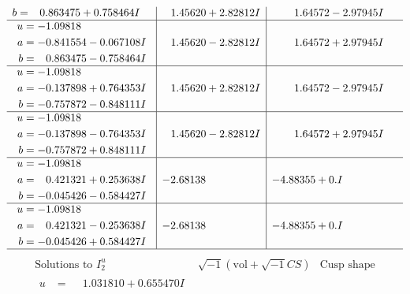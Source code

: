 \documentclass[1p]{elsarticle_modified}
\theoremstyle{definition}
\newcommand{\I}{\sqrt{-1}}
\begin{document}
$$\begin{array}{c|c|c}
\begin{aligned}
b &= \phantom{-}0.863475 + 0.758464 I\end{aligned}
 & \phantom{-}1.45620 + 2.82812 I & \phantom{-}1.64572 - 2.97945 I \\ \hline\begin{aligned}
u &= -1.09818\phantom{ +0.000000I} \\
a &= -0.841554 - 0.067108 I \\
b &= \phantom{-}0.863475 - 0.758464 I\end{aligned}
 & \phantom{-}1.45620 - 2.82812 I & \phantom{-}1.64572 + 2.97945 I \\ \hline\begin{aligned}
u &= -1.09818\phantom{ +0.000000I} \\
a &= -0.137898 + 0.764353 I \\
b &= -0.757872 - 0.848111 I\end{aligned}
 & \phantom{-}1.45620 + 2.82812 I & \phantom{-}1.64572 - 2.97945 I \\ \hline\begin{aligned}
u &= -1.09818\phantom{ +0.000000I} \\
a &= -0.137898 - 0.764353 I \\
b &= -0.757872 + 0.848111 I\end{aligned}
 & \phantom{-}1.45620 - 2.82812 I & \phantom{-}1.64572 + 2.97945 I \\ \hline\begin{aligned}
u &= -1.09818\phantom{ +0.000000I} \\
a &= \phantom{-}0.421321 + 0.253638 I \\
b &= -0.045426 - 0.584427 I\end{aligned}
 & -2.68138\phantom{ +0.000000I} & -4.88355 + 0. I\phantom{ +0.000000I} \\ \hline\begin{aligned}
u &= -1.09818\phantom{ +0.000000I} \\
a &= \phantom{-}0.421321 - 0.253638 I \\
b &= -0.045426 + 0.584427 I\end{aligned}
 & -2.68138\phantom{ +0.000000I} & -4.88355 + 0. I\phantom{ +0.000000I}\\
 \hline 
 \end{array}$$\newpage$$\begin{array}{c|c|c}  
\text{Solutions to }I^u_{2}& \I (\text{vol} + \sqrt{-1}CS) & \text{Cusp shape}\\
 \hline 
\begin{aligned}
u &= \phantom{-}1.031810 + 0.655470 I \\

\end{aligned}
\end{array}$$
\end{document}
